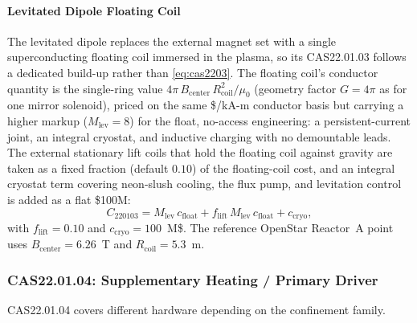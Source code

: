 \documentclass{article}
\begin{document}
\paragraph{Levitated Dipole Floating Coil}
The levitated dipole replaces the external magnet set with a single
superconducting floating coil immersed in the plasma, so its
CAS22.01.03 follows a dedicated build-up rather than
\cref{eq:cas2203}. The floating coil's conductor quantity is the
single-ring value $4\pi\, B_{\text{center}}\, R_{\text{coil}}^2/\mu_0$
(geometry factor $G = 4\pi$ as for one mirror solenoid), priced on the
same \$/kA-m conductor basis but carrying a higher markup
($M_{\text{lev}} = 8$) for the float, no-access engineering: a
persistent-current joint, an integral cryostat, and inductive charging
with no demountable leads. The external stationary lift coils that
hold the floating coil against gravity are taken as a fixed fraction
(default $0.10$) of the floating-coil cost, and an integral cryostat
term covering neon-slush cooling, the flux pump, and levitation
control is added as a flat \$100M:
\begin{equation}
\label{eq:cas2203-dipole}
C_{220103} = M_{\text{lev}}\, c_{\text{float}}
  + f_{\text{lift}}\, M_{\text{lev}}\, c_{\text{float}}
  + c_{\text{cryo}},
\end{equation}
with $f_{\text{lift}} = 0.10$ and $c_{\text{cryo}} = 100$~M\$. The
reference OpenStar Reactor~A point uses $B_{\text{center}} = 6.26$~T
and $R_{\text{coil}} = 5.3$~m.

\subsubsection{CAS22.01.04: Supplementary Heating / Primary Driver}
\label{sec:cas2204}

CAS22.01.04 covers different hardware depending on the confinement
family.
\end{document}
